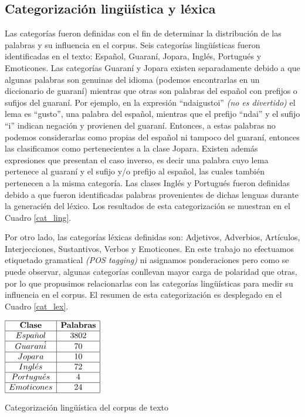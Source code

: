 \subsection{Categorizaci\'on ling\"u\'istica y l\'exica}\label{sec:categorizacion}

Las categor\'ias fueron definidas con el fin de determinar la distribuci\'on de las palabras y su influencia en el corpus. Seis categor\'ias ling\"u\'isticas fueron identificadas en el texto: Espa\~nol, Guaran\'i, Jopara, Ingl\'es, Portugu\'es y Emoticones. Las categor\'ias Guaran\'i y Jopara existen separadamente debido a que algunas palabras son genuinas del idioma (podemos encontrarlas en un diccionario de guaran\'i) mientras que otras son palabras del espa\~nol con prefijos o sufijos del guaran\'i. Por ejemplo, en la expresi\'on ``ndaigustoi'' \textit{(no es divertido)} el lema es ``gusto'', una palabra del espa\~nol, mientras que el prefijo ``ndai'' y el sufijo ``i'' indican negaci\'on y provienen del guaran\'i. Entonces, a estas palabras no podemos considerarlas como propias del espa\~nol ni tampoco del guaran\'i, entonces las clasificamos como pertenecientes a la clase Jopara. Existen adem\'as expresiones que presentan el caso inverso, es decir una palabra cuyo lema pertenece al guaran\'i y el sufijo y/o prefijo al espa\~nol, las cuales tambi\'en pertenecen a la misma categor\'ia. Las clases Ingl\'es y Portugu\'es fueron definidas debido a que fueron identificadas palabras provenientes de dichas lenguas durante la generaci\'en del l\'exico. Los resultados de esta categorizaci\'on se muestran en el Cuadro \ref{cat_ling}.
\newline

Por otro lado, las categor\'ias l\'exicas definidas son: Adjetivos, Adverbios, Art\'iculos, Interjecciones, Sustantivos, Verbos y Emoticones. En este trabajo no efectuamos etiquetado gramatical \textit{(POS tagging)} ni asignamos ponderaciones pero como se puede observar,  algunas categor\'ias conllevan mayor carga de polaridad que otras, por lo que propusimos relacionarlas con las categor\'ias ling\"u\'isticas para medir su influencia en el corpus. El resumen de esta categorizaci\'on es desplegado en el Cuadro \ref{cat_lex}.
\newline

\begin{table}[htb] 
\centering

$
\begin{array}{|c|c|}
      \hline
      \mathbf{Clase}  	& \mathbf{Palabras}	\\
      \hline
      Espa\tilde{n}ol 	& 3802				\\
      \hline
      Guaran\acute{i} 	& 70 				\\
      \hline
      Jopara			& 10				\\
      \hline
      Ingl\acute{e}s	& 72				\\
      \hline
      Portugu\acute{e}s	& 4					\\
      \hline
      Emoticones		& 24				\\
      \hline
\end{array}
$
\caption{Categorizaci\'on ling\"u\'istica del corpus de texto}
\label{cat_ling}
\end{table}


